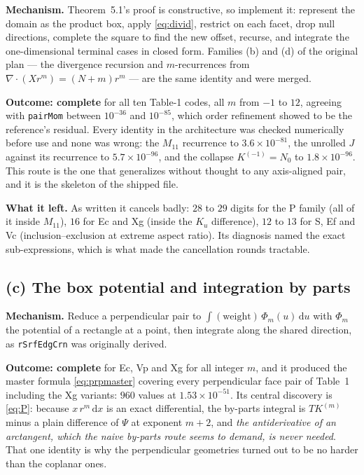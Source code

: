 \documentclass[11pt]{article}
\theoremstyle{remark}
\newcommand{\dd}{\mathrm{d}}
\newcommand{\code}[1]{\texttt{#1}}
\begin{document}
\textbf{Mechanism.} Theorem~5.1's proof is constructive, so implement it: represent the
domain as the product box, apply \eqref{eq:divid}, restrict on each facet, drop null
directions, complete the square to find the new offset, recurse, and integrate the
one-dimensional terminal cases in closed form. Families (b) and (d) of the original plan
--- the divergence recursion and $m$-recurrences from $\nabla\cdot(Xr^m) = (N+m)r^m$ ---
are the same identity and were merged.

\textbf{Outcome: complete} for all ten Table-1 codes, all $m$ from $-1$ to $12$, agreeing
with \code{pairMom} between $10^{-36}$ and $10^{-85}$, which order refinement showed to be
the reference's residual. Every identity in the architecture was checked numerically before
use and none was wrong: the $M_{11}$ recurrence to $3.6\times10^{-81}$, the unrolled $J$
against its recurrence to $5.7\times10^{-96}$, and the collapse $K^{(-1)} = N_0$ to
$1.8\times10^{-96}$. This route is the one that generalizes without thought to any
axis-aligned pair, and it is the skeleton of the shipped file.

\textbf{What it left.} As written it cancels badly: $28$ to $29$ digits for the P family
(all of it inside $M_{11}$), $16$ for Ec and Xg (inside the $K_u$ difference), $12$ to $13$
for S, Ef and Vc (inclusion--exclusion at extreme aspect ratio). Its diagnosis named the
exact sub-expressions, which is what made the cancellation rounds tractable.

\subsection{(c) The box potential and integration by parts}

\textbf{Mechanism.} Reduce a perpendicular pair to $\int(\text{weight})\,\Phi_m(u)\,\dd u$
with $\Phi_m$ the potential of a rectangle at a point, then integrate along the shared
direction, as \code{rSrfEdgCrn} was originally derived.

\textbf{Outcome: complete} for Ec, Vp and Xg for all integer $m$, and it produced the
master formula \eqref{eq:prpmaster} covering every perpendicular face pair of Table~1
including the Xg variants: $960$ values at $1.53\times10^{-51}$. Its central discovery is
\eqref{eq:P}: because $x\,r^m\,\dd x$ is an exact differential, the by-parts integral is
$TK^{(m)}$ minus a plain difference of $\Psi$ at exponent $m+2$, and \emph{the antiderivative
of an arctangent, which the naive by-parts route seems to demand, is never needed}. That
one identity is why the perpendicular geometries turned out to be no harder than the
coplanar ones.
\end{document}
